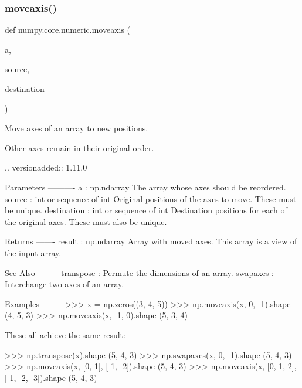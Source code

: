  \mbox{\label{namespacenumpy_1_1core_1_1numeric_ac7ac41a75a5af16516241f4a6fb96e6b}} 
\subsubsection{\texorpdfstring{moveaxis()}{moveaxis()}}
{\footnotesize\ttfamily def numpy.\+core.\+numeric.\+moveaxis (\begin{DoxyParamCaption}\item[{}]{a,  }\item[{}]{source,  }\item[{}]{destination }\end{DoxyParamCaption})}

\begin{DoxyVerb}Move axes of an array to new positions.

Other axes remain in their original order.

.. versionadded:: 1.11.0

Parameters
----------
a : np.ndarray
    The array whose axes should be reordered.
source : int or sequence of int
    Original positions of the axes to move. These must be unique.
destination : int or sequence of int
    Destination positions for each of the original axes. These must also be
    unique.

Returns
-------
result : np.ndarray
    Array with moved axes. This array is a view of the input array.

See Also
--------
transpose : Permute the dimensions of an array.
swapaxes : Interchange two axes of an array.

Examples
--------
>>> x = np.zeros((3, 4, 5))
>>> np.moveaxis(x, 0, -1).shape
(4, 5, 3)
>>> np.moveaxis(x, -1, 0).shape
(5, 3, 4)

These all achieve the same result:

>>> np.transpose(x).shape
(5, 4, 3)
>>> np.swapaxes(x, 0, -1).shape
(5, 4, 3)
>>> np.moveaxis(x, [0, 1], [-1, -2]).shape
(5, 4, 3)
>>> np.moveaxis(x, [0, 1, 2], [-1, -2, -3]).shape
(5, 4, 3)\end{DoxyVerb}
 \mbox{\label{namespacenumpy_1_1core_1_1numeric_a9d5bcc0eaa759ce1ab86f25402ae03ac}} 
